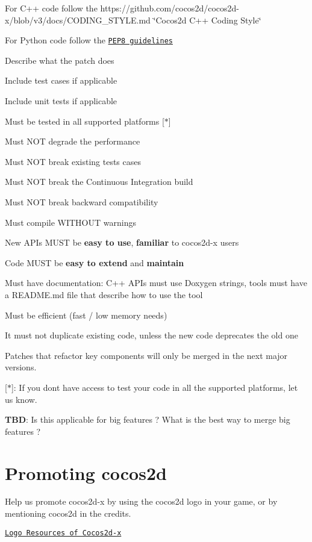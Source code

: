 \begin{DoxyItemize}
\item For C++ code follow the https\+://github.com/cocos2d/cocos2d-\/x/blob/v3/docs/\+C\+O\+D\+I\+N\+G\+\_\+\+S\+T\+Y\+L\+E.\+md \char`\"{}\+Cocos2d C++ Coding Style\char`\"{}
\item For Python code follow the \href{https://www.python.org/dev/peps/pep-0008}{\tt P\+E\+P8 guidelines}
\item Describe what the patch does
\item Include test cases if applicable
\item Include unit tests if applicable
\item Must be tested in all supported platforms \mbox{[}$\ast$\mbox{]}
\item Must N\+OT degrade the performance
\item Must N\+OT break existing tests cases
\item Must N\+OT break the Continuous Integration build
\item Must N\+OT break backward compatibility
\item Must compile W\+I\+T\+H\+O\+UT warnings
\item New A\+P\+Is M\+U\+ST be {\bfseries easy to use}, {\bfseries familiar} to cocos2d-\/x users
\item Code M\+U\+ST be {\bfseries easy to extend} and {\bfseries maintain}
\item Must have documentation\+: C++ A\+P\+Is must use Doxygen strings, tools must have a R\+E\+A\+D\+M\+E.\+md file that describe how to use the tool
\item Must be efficient (fast / low memory needs)
\item It must not duplicate existing code, unless the new code deprecates the old one
\item Patches that refactor key components will only be merged in the next major versions.
\end{DoxyItemize}

\mbox{[}$\ast$\mbox{]}\+: If you don\textquotesingle{}t have access to test your code in all the supported platforms, let us know.

{\bfseries T\+BD}\+: Is this applicable for big features ? What is the best way to merge big features ?

\section*{Promoting cocos2d}

Help us promote cocos2d-\/x by using the cocos2d logo in your game, or by mentioning cocos2d in the credits.

\href{http://www.cocos2d-x.org/wiki/Logo_Resources_of_Cocos2d-x}{\tt Logo Resources of Cocos2d-\/x} 